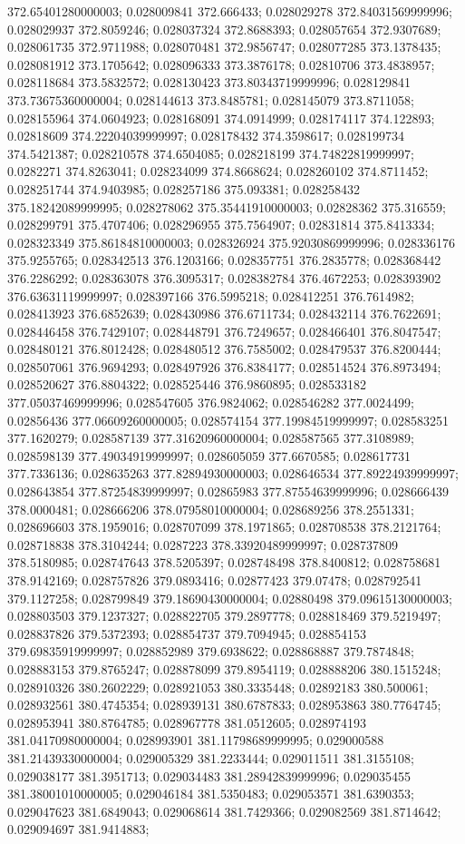 372.65401280000003; 0.028009841 372.666433; 0.028029278 372.84031569999996; 0.028029937 372.8059246; 0.028037324 372.8688393; 0.028057654 372.9307689; 0.028061735 372.9711988; 0.028070481 372.9856747; 0.028077285 373.1378435; 0.028081912 373.1705642; 0.028096333 373.3876178; 0.02810706 373.4838957; 0.028118684 373.5832572; 0.028130423 373.80343719999996; 0.028129841 373.73675360000004; 0.028144613 373.8485781; 0.028145079 373.8711058; 0.028155964 374.0604923; 0.028168091 374.0914999; 0.028174117 374.122893; 0.02818609 374.22204039999997; 0.028178432 374.3598617; 0.028199734 374.5421387; 0.028210578 374.6504085; 0.028218199 374.74822819999997; 0.0282271 374.8263041; 0.028234099 374.8668624; 0.028260102 374.8711452; 0.028251744 374.9403985; 0.028257186 375.093381; 0.028258432 375.18242089999995; 0.028278062 375.35441910000003; 0.02828362 375.316559; 0.028299791 375.4707406; 0.028296955 375.7564907; 0.02831814 375.8413334; 0.028323349 375.86184810000003; 0.028326924 375.92030869999996; 0.028336176 375.9255765; 0.028342513 376.1203166; 0.028357751 376.2835778; 0.028368442 376.2286292; 0.028363078 376.3095317; 0.028382784 376.4672253; 0.028393902 376.63631119999997; 0.028397166 376.5995218; 0.028412251 376.7614982; 0.028413923 376.6852639; 0.028430986 376.6711734; 0.028432114 376.7622691; 0.028446458 376.7429107; 0.028448791 376.7249657; 0.028466401 376.8047547; 0.028480121 376.8012428; 0.028480512 376.7585002; 0.028479537 376.8200444; 0.028507061 376.9694293; 0.028497926 376.8384177; 0.028514524 376.8973494; 0.028520627 376.8804322; 0.028525446 376.9860895; 0.028533182 377.05037469999996; 0.028547605 376.9824062; 0.028546282 377.0024499; 0.02856436 377.06609260000005; 0.028574154 377.19984519999997; 0.028583251 377.1620279; 0.028587139 377.31620960000004; 0.028587565 377.3108989; 0.028598139 377.49034919999997; 0.028605059 377.6670585; 0.028617731 377.7336136; 0.028635263 377.82894930000003; 0.028646534 377.89224939999997; 0.028643854 377.87254839999997; 0.02865983 377.87554639999996; 0.028666439 378.0000481; 0.028666206 378.07958010000004; 0.028689256 378.2551331; 0.028696603 378.1959016; 0.028707099 378.1971865; 0.028708538 378.2121764; 0.028718838 378.3104244; 0.0287223 378.33920489999997; 0.028737809 378.5180985; 0.028747643 378.5205397; 0.028748498 378.8400812; 0.028758681 378.9142169; 0.028757826 379.0893416; 0.02877423 379.07478; 0.028792541 379.1127258; 0.028799849 379.18690430000004; 0.02880498 379.09615130000003; 0.028803503 379.1237327; 0.028822705 379.2897778; 0.028818469 379.5219497; 0.028837826 379.5372393; 0.028854737 379.7094945; 0.028854153 379.69835919999997; 0.028852989 379.6938622; 0.028868887 379.7874848; 0.028883153 379.8765247; 0.028878099 379.8954119; 0.028888206 380.1515248; 0.028910326 380.2602229; 0.028921053 380.3335448; 0.02892183 380.500061; 0.028932561 380.4745354; 0.028939131 380.6787833; 0.028953863 380.7764745; 0.028953941 380.8764785; 0.028967778 381.0512605; 0.028974193 381.04170980000004; 0.028993901 381.11798689999995; 0.029000588 381.21439330000004; 0.029005329 381.2233444; 0.029011511 381.3155108; 0.029038177 381.3951713; 0.029034483 381.28942839999996; 0.029035455 381.38001010000005; 0.029046184 381.5350483; 0.029053571 381.6390353; 0.029047623 381.6849043; 0.029068614 381.7429366; 0.029082569 381.8714642; 0.029094697 381.9414883; 